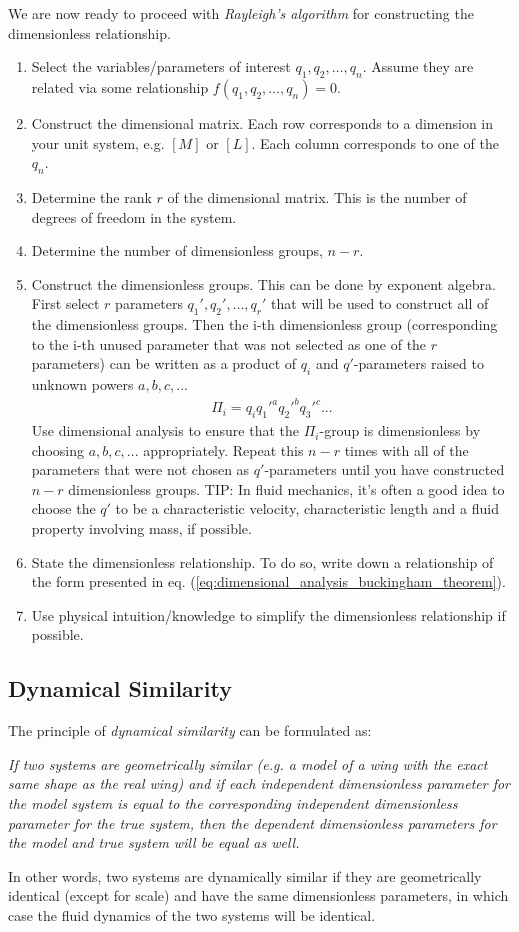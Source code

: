 \documentclass[a4paper, 12pt]{article}
\numberwithin{equation}{subsubsection}
\begin{document}
We are now ready to proceed with \textit{Rayleigh's algorithm} for constructing the dimensionless relationship.
\begin{enumerate}
	\item Select the variables/parameters of interest $q_1, q_2, \dots, q_n$. Assume they are related via some relationship $f(q_1, q_2, \dots, q_n) = 0$.
	\item Construct the dimensional matrix. Each row corresponds to a dimension in your unit system, e.g. $[M]$ or $[L]$. Each column corresponds to one of the $q_n$.
	\item Determine the rank $r$ of the dimensional matrix. This is the number of degrees of freedom in the system.
	\item Determine the number of dimensionless groups, $n-r$.
	\item Construct the dimensionless groups. This can be done by exponent algebra. First select $r$ parameters $q_1', q_2', \dots, q_r'$ that will be used to construct all of the dimensionless groups. Then the i-th dimensionless group (corresponding to the i-th unused parameter that was not selected as one of the $r$ parameters) can be written as a product of $q_i$ and $q'$-parameters raised to unknown powers $a, b, c, ...$
	\begin{align*}
		\Pi_i = q_i q_1'^a q_2'^b q_3'^c ...
	\end{align*}
	Use dimensional analysis to ensure that the $\Pi_i$-group is dimensionless by choosing $a, b, c, ...$ appropriately. Repeat this $n-r$ times with all of the parameters that were not chosen as $q'$-parameters until you have constructed $n-r$ dimensionless groups. TIP: In fluid mechanics, it's often a good idea to choose the $q'$ to be a characteristic velocity, characteristic length and a fluid property involving mass, if possible.
	\item State the dimensionless relationship. To do so, write down a relationship of the form presented in eq. (\ref{eq:dimensional_analysis_buckingham_theorem}).
	\item Use physical intuition/knowledge to simplify the dimensionless relationship if possible.

\end{enumerate}

\subsection{Dynamical Similarity}
The principle of \textit{dynamical similarity} can be formulated as:

\textit{If two systems are geometrically similar (e.g. a model of a wing with the exact same shape as the real wing) and if each independent dimensionless parameter for the model system is equal to the corresponding independent dimensionless parameter for the true system, then the dependent dimensionless parameters for the model and true system will be equal as well.}

In other words, two systems are dynamically similar if they are geometrically identical (except for scale) and have the same dimensionless parameters, in which case the fluid dynamics of the two systems will be identical.
\end{document}
